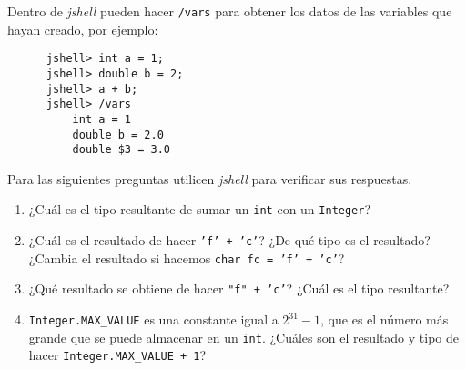   \begin{exercise}
    Dentro de \textit{jshell} pueden hacer \texttt{/vars} para obtener los datos de las variables 
    que hayan creado, por ejemplo:
    \begin{verbatim}
      jshell> int a = 1;
      jshell> double b = 2;
      jshell> a + b;
      jshell> /vars
          int a = 1
          double b = 2.0
          double $3 = 3.0
    \end{verbatim}

    Para las siguientes preguntas utilicen \textit{jshell} para verificar sus respuestas.
    \begin{enumerate}
      \item ¿Cuál es el tipo resultante de sumar un \texttt{int} con un \texttt{Integer}?
      \item ¿Cuál es el resultado de hacer \texttt{'f' + 'c'}?
        ¿De qué tipo es el resultado?
        ¿Cambia el resultado si hacemos \texttt{char fc = 'f' + 'c'}?
      \item ¿Qué resultado se obtiene de hacer \texttt{"f" + 'c'}?
        ¿Cuál es el tipo resultante?
      \item \texttt{Integer.MAX_VALUE} es una constante igual a \(2^{31} - 1\), que es el 
        número más grande que se puede almacenar en un \texttt{int}.
        ¿Cuáles son el resultado y tipo de hacer \texttt{Integer.MAX_VALUE + 1}?
    \end{enumerate}
  \end{exercise}
